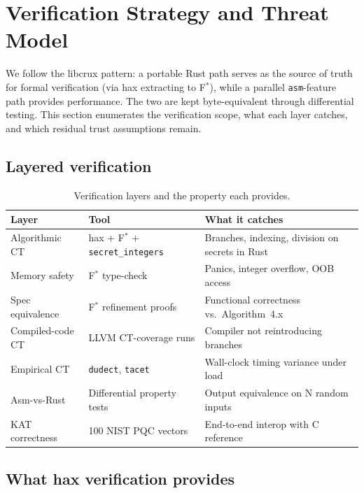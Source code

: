 \section{Verification Strategy and Threat Model}
\label{sec:verification}

We follow the libcrux\cite{libcrux} pattern: a portable Rust path
serves as the source of truth for formal verification (via
hax\cite{hax-toolchain} extracting to F$^*$), while a parallel
\texttt{asm}-feature path provides performance.  The two are kept
byte-equivalent through differential testing.  This section
enumerates the verification scope, what each layer catches, and
which residual trust assumptions remain.

\subsection{Layered verification}

\begin{table}[h]
\centering
\small
\begin{tabular}{l l l}
\toprule
\textbf{Layer} & \textbf{Tool} & \textbf{What it catches} \\
\midrule
Algorithmic CT       & hax + F$^*$ + \texttt{secret\_integers}
                     & Branches, indexing, division on secrets in Rust \\
Memory safety        & F$^*$ type-check                 & Panics, integer overflow, OOB access \\
Spec equivalence     & F$^*$ refinement proofs         & Functional correctness vs.\ Algorithm~4.x \\
Compiled-code CT     & LLVM CT-coverage runs           & Compiler not reintroducing branches \\
Empirical CT         & \texttt{dudect}, \texttt{tacet} & Wall-clock timing variance under load \\
Asm-vs-Rust          & Differential property tests     & Output equivalence on N random inputs \\
KAT correctness      & 100 NIST PQC vectors            & End-to-end interop with C reference \\
\bottomrule
\end{tabular}
\caption{Verification layers and the property each provides.}
\label{tab:verification-layers}
\end{table}

\subsection{What hax verification provides}

